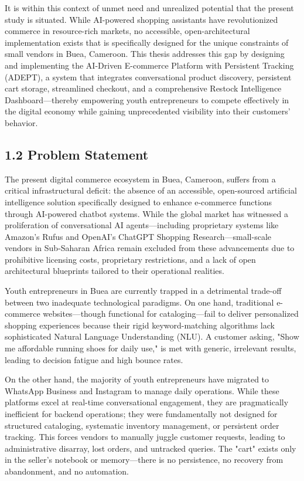 \documentclass[12pt,a4paper]{article}
\begin{document}
It is within this context of unmet need and unrealized potential that the present study is situated. While AI-powered shopping assistants have revolutionized commerce in resource-rich markets, no accessible, open-architectural implementation exists that is specifically designed for the unique constraints of small vendors in Buea, Cameroon. This thesis addresses this gap by designing and implementing the AI-Driven E-commerce Platform with Persistent Tracking (ADEPT), a system that integrates conversational product discovery, persistent cart storage, streamlined checkout, and a comprehensive Restock Intelligence Dashboard---thereby empowering youth entrepreneurs to compete effectively in the digital economy while gaining unprecedented visibility into their customers' behavior.

\subsection{1.2 Problem Statement}

The present digital commerce ecosystem in Buea, Cameroon, suffers from a critical infrastructural deficit: the absence of an accessible, open-sourced artificial intelligence solution specifically designed to enhance e-commerce functions through AI-powered chatbot systems. While the global market has witnessed a proliferation of conversational AI agents---including proprietary systems like Amazon's Rufus and OpenAI's ChatGPT Shopping Research---small-scale vendors in Sub-Saharan Africa remain excluded from these advancements due to prohibitive licensing costs, proprietary restrictions, and a lack of open architectural blueprints tailored to their operational realities.

Youth entrepreneurs in Buea are currently trapped in a detrimental trade-off between two inadequate technological paradigms. On one hand, traditional e-commerce websites---though functional for cataloging---fail to deliver personalized shopping experiences because their rigid keyword-matching algorithms lack sophisticated Natural Language Understanding (NLU). A customer asking, "Show me affordable running shoes for daily use," is met with generic, irrelevant results, leading to decision fatigue and high bounce rates.

On the other hand, the majority of youth entrepreneurs have migrated to WhatsApp Business and Instagram to manage daily operations. While these platforms excel at real-time conversational engagement, they are pragmatically inefficient for backend operations; they were fundamentally not designed for structured cataloging, systematic inventory management, or persistent order tracking. This forces vendors to manually juggle customer requests, leading to administrative disarray, lost orders, and untracked queries. The "cart" exists only in the seller's notebook or memory---there is no persistence, no recovery from abandonment, and no automation.
\end{document}
